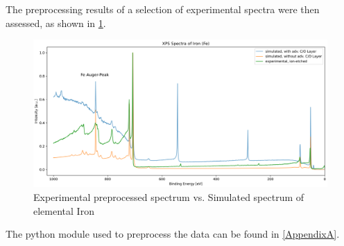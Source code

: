 The preprocessing results of a selection of experimental spectra were then assessed, as shown in \ref{fig:ex_vs_sim}.

\begin{figure}
    \centering
    \includegraphics[width=\textwidth]{Figures/Fe_XPS.png}
    \caption{Experimental preprocessed spectrum vs. Simulated spectrum of elemental Iron}
    \label{fig:ex_vs_sim}
\end{figure}

The python module used to preprocess the data can be found in \ref{AppendixA}.